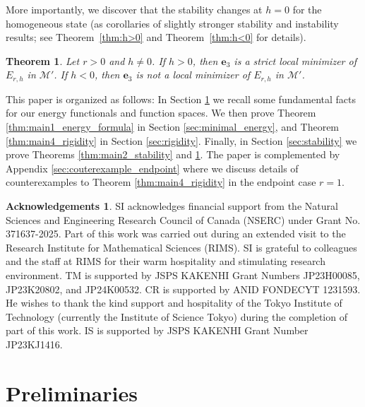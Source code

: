 \documentclass{amsart}
\numberwithin{equation}{section}
\newtheorem{theorem}{Theorem}[section]
\theoremstyle{definition}
\newtheorem*{acknowledgements}{Acknowledgements}
\theoremstyle{remark}
\newcommand{\boM}{\mathcal{M}}
\newcommand{\boe}{{\mathbf{e}}}
\begin{document}
More importantly, we discover that the stability changes at $h=0$ for the homogeneous state (as corollaries of slightly stronger stability and instability results; see Theorem~\ref{thm:h>0} and Theorem~\ref{thm:h<0} for details).

\begin{theorem}\label{thm:main3_staiblity_transition}
    Let $r>0$ and $h\neq0$.
    If $h>0$, then $\boe_3$ is a strict local minimizer of $E_{r,h}$ in $\boM'$.
    If $h<0$, then $\boe_3$ is not a local minimizer of $E_{r,h}$ in $\boM'$.
\end{theorem}

This paper is organized as follows: In Section \ref{sec:prelim} we recall some fundamental facts for our energy functionals and function spaces.
We then prove Theorem \ref{thm:main1_energy_formula} in Section \ref{sec:minimal_energy}, and Theorem \ref{thm:main4_rigidity} in Section \ref{sec:rigidity}.
Finally, in Section \ref{sec:stability} we prove Theorems \ref{thm:main2_stability} and \ref{thm:main3_staiblity_transition}.
The paper is complemented by Appendix \ref{sec:couterexample_endpoint} where we discuss details of counterexamples to Theorem \ref{thm:main4_rigidity} in the endpoint case $r=1$.


\begin{acknowledgements}
    SI acknowledges financial support from the Natural Sciences and Engineering Research Council of Canada (NSERC) under Grant No. 371637-2025. Part of this work was carried out during an extended visit to the Research Institute for Mathematical Sciences (RIMS). SI is grateful to colleagues and the staff at RIMS for their warm hospitality and stimulating research environment.
    TM is supported by JSPS KAKENHI Grant Numbers JP23H00085, JP23K20802, and JP24K00532.
    CR is supported by ANID FONDECYT 1231593. He wishes to thank the kind support and hospitality of the Tokyo Institute of Technology (currently the Institute of Science Tokyo) during the completion of part of this work.
    IS is supported by JSPS KAKENHI Grant Number JP23KJ1416.
\end{acknowledgements}





\section{Preliminaries}\label{sec:prelim}
\end{document}
